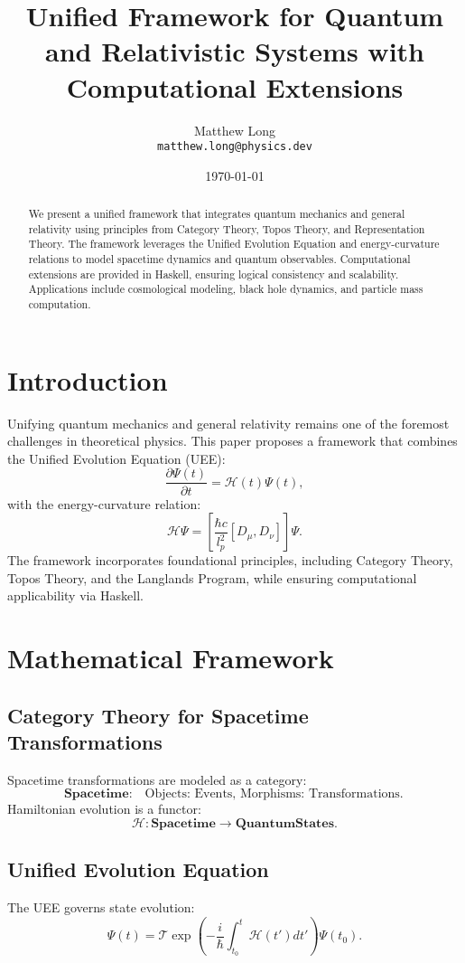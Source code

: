 \documentclass[a4paper,11pt]{article}
\title{Unified Framework for Quantum and Relativistic Systems with Computational Extensions}
\author{Matthew Long \\ \texttt{matthew.long@physics.dev}}
\date{\today}
\begin{document}
\maketitle

\begin{abstract}
We present a unified framework that integrates quantum mechanics and general relativity using principles from Category Theory, Topos Theory, and Representation Theory. The framework leverages the Unified Evolution Equation and energy-curvature relations to model spacetime dynamics and quantum observables. Computational extensions are provided in Haskell, ensuring logical consistency and scalability. Applications include cosmological modeling, black hole dynamics, and particle mass computation.
\end{abstract}

\section{Introduction}
Unifying quantum mechanics and general relativity remains one of the foremost challenges in theoretical physics. This paper proposes a framework that combines the Unified Evolution Equation (UEE):
\[
\frac{\partial \Psi(t)}{\partial t} = \mathcal{H}(t) \Psi(t),
\]
with the energy-curvature relation:
\[
\mathcal{H} \Psi = \left[\frac{\hbar c}{l_p^2} [D_\mu, D_\nu] \right] \Psi.
\]
The framework incorporates foundational principles, including Category Theory, Topos Theory, and the Langlands Program, while ensuring computational applicability via Haskell.

\section{Mathematical Framework}
\subsection{Category Theory for Spacetime Transformations}
Spacetime transformations are modeled as a category:
\[
\textbf{Spacetime}: \quad \text{Objects: Events, Morphisms: Transformations.}
\]
Hamiltonian evolution is a functor:
\[
\mathcal{H}: \textbf{Spacetime} \to \textbf{QuantumStates}.
\]

\subsection{Unified Evolution Equation}
The UEE governs state evolution:
\[
\Psi(t) = \mathcal{T} \exp \left( -\frac{i}{\hbar} \int_{t_0}^t \mathcal{H}(t') dt' \right) \Psi(t_0).
\]
\end{document}
